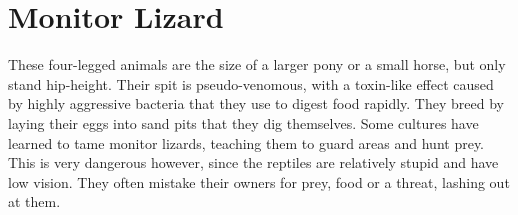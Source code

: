 \section{Monitor Lizard}

These four-legged animals are the size of a larger pony or a small horse, but only stand hip-height. Their spit is pseudo-venomous, with a toxin-like effect caused by highly aggressive bacteria that they use to digest food rapidly. They breed by laying their eggs into sand pits that they dig themselves. Some cultures have learned to tame monitor lizards, teaching them to guard areas and hunt prey. This is very dangerous however, since the reptiles are relatively stupid and have low vision. They often mistake their owners for prey, food or a threat, lashing out at them.